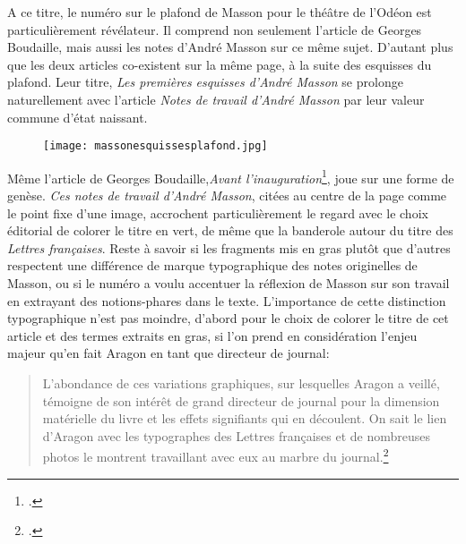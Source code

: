 	A ce titre, le numéro sur le plafond de Masson pour le théâtre de l’Odéon est particulièrement révélateur. Il comprend non seulement l’article de Georges Boudaille, mais aussi les notes d’André Masson sur ce même sujet. D’autant plus que les deux articles co-existent sur la même page, à la suite des esquisses du plafond. Leur titre, \emph{Les premières esquisses d’André Masson} se prolonge naturellement avec l’article \emph{Notes de travail d’André Masson} par leur valeur commune d’état naissant. 

	\begin{figure}[H]
   \centering
   \texttt{[image: massonesquissesplafond.jpg]}
	\caption{\cite{plafondodeon}}\label{fig:Notesdetravail}
\end{figure}



Même l’article de Georges Boudaille,\emph{Avant l’inauguration}\footcite{avantinauguration}, joue sur une forme de genèse. \emph{Ces notes de travail d’André Masson}, citées au centre de la page comme le point fixe d’une image, accrochent particulièrement le regard avec le choix éditorial de colorer le titre en vert, de même que la banderole autour du titre des \emph{Lettres françaises}. Reste à savoir si les fragments mis en gras plutôt que d’autres respectent une différence de marque typographique des notes originelles de Masson, ou si le numéro a voulu accentuer la réflexion de Masson sur son travail en extrayant des notions-phares dans le texte. L’importance de cette distinction typographique n’est pas moindre, d’abord pour le choix de colorer le titre de cet article et des termes extraits en gras, si l’on prend en considération l’enjeu majeur qu’en fait Aragon en tant que directeur de journal: 

\begin{quote}
L’abondance de ces variations graphiques, sur lesquelles Aragon a veillé, témoigne de son intérêt de grand directeur de journal pour la dimension matérielle du livre et les effets signifiants qui en découlent. On sait le lien d’Aragon avec les typographes des Lettres françaises et de nombreuses photos le montrent travaillant avec eux au marbre du journal.\footcite[p333]{vasseviere}	
\end{quote}

